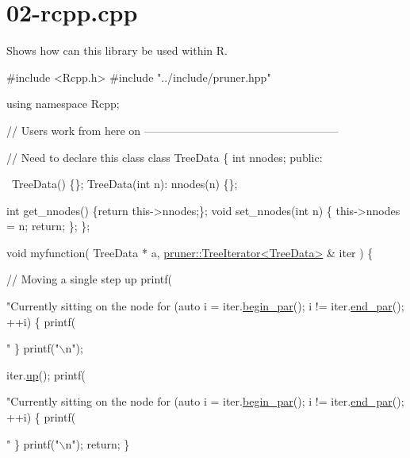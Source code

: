 \hypertarget{02-rcpp_8cpp-example}{}\section{02-\/rcpp.\+cpp}
Shows how can this library be used within R.


\begin{DoxyCodeInclude}
\textcolor{preprocessor}{#include <Rcpp.h>}
\textcolor{preprocessor}{#include "../include/pruner.hpp"}  

\textcolor{keyword}{using namespace }Rcpp; 

\textcolor{comment}{// Users work from here on -----------------------------------------------------}

\textcolor{comment}{// Need to declare this class}
\textcolor{keyword}{class }TreeData \{
  \textcolor{keywordtype}{int} nnodes;
\textcolor{keyword}{public}:
  
  ~TreeData() \{\};
  TreeData(\textcolor{keywordtype}{int} n): nnodes(n) \{\};
  
  \textcolor{keywordtype}{int} get\_nnodes() \{\textcolor{keywordflow}{return} this->nnodes;\};
  \textcolor{keywordtype}{void} set\_nnodes(\textcolor{keywordtype}{int} n) \{
    this->nnodes = n;
    \textcolor{keywordflow}{return};
  \};
\};

\textcolor{keywordtype}{void} myfunction(
    TreeData * a,
    \hyperlink{classpruner_1_1TreeIterator}{pruner::TreeIterator<TreeData>} & iter
  ) \{
  
  \textcolor{comment}{// Moving a single step up}
  printf(\textcolor{stringliteral}{"Currently sitting on the node %
  \textcolor{keywordflow}{for} (\textcolor{keyword}{auto} i = iter.\hyperlink{classpruner_1_1TreeIterator_ad1435c13e19ed83e6222285753996567}{begin\_par}(); i != iter.\hyperlink{classpruner_1_1TreeIterator_aec582d1a4bf6b892532d41f1f9b8044d}{end\_par}(); ++i) \{
    printf(\textcolor{stringliteral}{" %
  \}
  printf(\textcolor{stringliteral}{"\(\backslash\)n"});
  
  iter.\hyperlink{classpruner_1_1TreeIterator_af7f80d5909938115bf9e6455ac8950b3}{up}();
  printf(\textcolor{stringliteral}{"Currently sitting on the node %
  \textcolor{keywordflow}{for} (\textcolor{keyword}{auto} i = iter.\hyperlink{classpruner_1_1TreeIterator_ad1435c13e19ed83e6222285753996567}{begin\_par}(); i != iter.\hyperlink{classpruner_1_1TreeIterator_aec582d1a4bf6b892532d41f1f9b8044d}{end\_par}(); ++i) \{
    printf(\textcolor{stringliteral}{" %
  \}
  printf(\textcolor{stringliteral}{"\(\backslash\)n"});
  \textcolor{keywordflow}{return};
\}

}}}}
\end{DoxyCodeInclude}
